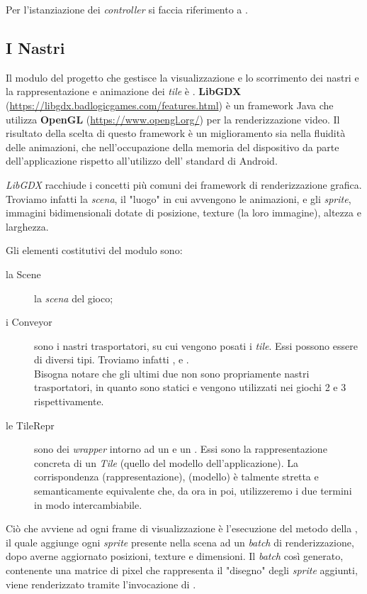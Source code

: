 Per l'istanziazione dei \textit{controller} si faccia riferimento a .

\subsection{I Nastri}
\label{subsec:libgdx}
Il modulo del progetto che gestisce la visualizzazione e lo scorrimento dei nastri e la rappresentazione e animazione dei \textit{tile} è . \textbf{LibGDX} (\url{https://libgdx.badlogicgames.com/features.html}) è un framework Java che utilizza \textbf{OpenGL} (\url{https://www.opengl.org/}) per la renderizzazione video. Il risultato della scelta di questo framework è un miglioramento sia nella fluidità delle animazioni, che nell'occupazione della memoria del dispositivo da parte dell'applicazione rispetto all'utilizzo dell' standard di Android.

\textit{LibGDX} racchiude i concetti più comuni dei framework di renderizzazione grafica. Troviamo infatti la \textit{scena}, il "luogo" in cui avvengono le animazioni, e gli \textit{sprite}, immagini bidimensionali dotate di posizione, texture (la loro immagine), altezza e larghezza.

Gli elementi costitutivi del modulo  sono:

\begin{description}
    \item[la Scene] la \textit{scena} del gioco;
    \item[i Conveyor] sono i nastri trasportatori, su cui vengono posati i \textit{tile}. Essi possono essere di diversi tipi. Troviamo infatti ,  e .\\
        Bisogna notare che gli ultimi due non sono propriamente nastri trasportatori, in quanto sono statici e vengono utilizzati nei giochi 2 e 3 rispettivamente.
    \item[le TileRepr] sono dei \textit{wrapper} intorno ad un  e un . Essi sono la rappresentazione concreta di un \textit{Tile} (quello del modello dell'applicazione). La corrispondenza  (rappresentazione),  (modello) è talmente stretta e semanticamente equivalente che, da ora in poi, utilizzeremo i due termini in modo intercambiabile.
\end{description}

Ciò che avviene ad ogni frame di visualizzazione è l'esecuzione del metodo  della , il quale aggiunge ogni \textit{sprite} presente nella scena ad un \textit{batch} di renderizzazione, dopo averne aggiornato posizioni, texture e dimensioni. Il \textit{batch} così generato, contenente una matrice di pixel che rappresenta il "disegno" degli \textit{sprite} aggiunti, viene renderizzato tramite l'invocazione di .

